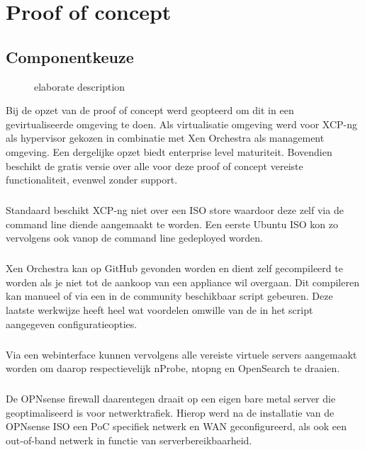 \chapter{Proof of concept}

\section{Componentkeuze}

\begin{figure}[H]
    
    \caption[short description]{elaborate description}
    \label{fig:Componentkeuze}
\end{figure}

Bij de opzet van de proof of concept werd geopteerd om dit in een gevirtualiseerde omgeving te doen. Als virtualisatie omgeving werd voor XCP-ng als hypervisor gekozen in combinatie met Xen Orchestra als management omgeving. Een dergelijke opzet biedt enterprise level maturiteit. Bovendien beschikt de gratis versie over alle voor deze proof of concept vereiste functionaliteit, evenwel zonder support.

\paragraph{}
Standaard beschikt XCP-ng niet over een ISO store waardoor deze zelf via de command line diende aangemaakt te worden. Een eerste Ubuntu ISO kon zo vervolgens ook vanop de command line gedeployed worden.

\paragraph{}
Xen Orchestra kan op GitHub gevonden worden en dient zelf gecompileerd te worden als je niet tot de aankoop van een appliance wil overgaan. Dit compileren kan manueel of via een in de community beschikbaar script gebeuren. Deze laatste werkwijze heeft heel wat voordelen omwille van de in het script aangegeven configuratieopties.

\paragraph{}
Via een webinterface kunnen vervolgens alle vereiste virtuele servers aangemaakt worden om daarop respectievelijk nProbe, ntopng en OpenSearch te draaien.

\paragraph{}
De OPNsense firewall daarentegen draait op een eigen bare metal server die geoptimaliseerd is voor netwerktrafiek. Hierop werd na de installatie van de OPNsense ISO een PoC specifiek netwerk en WAN geconfigureerd, als ook een out-of-band netwerk in functie van serverbereikbaarheid.

